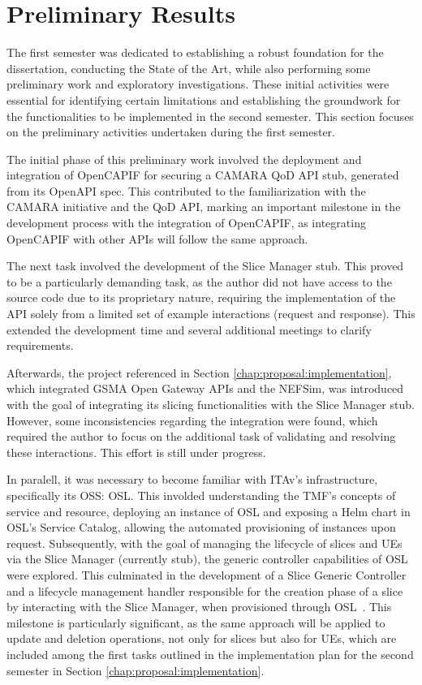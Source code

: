 \section{Preliminary Results}
\label{chap:proposal:preliminary}

The first semester was dedicated to establishing a robust foundation for the dissertation, conducting the State of the Art, while also performing some  preliminary work and exploratory investigations. These initial activities were essential for identifying certain limitations and establishing the groundwork for the functionalities to be implemented in the second semester. This section focuses on the preliminary activities undertaken during the first semester.

The initial phase of this preliminary work involved the deployment and integration of OpenCAPIF for securing a CAMARA \acs{QoD} \acs{API} stub, generated from its Open\acs{API} spec. This contributed to the familiarization with the CAMARA initiative and the \acs{QoD} \acs{API}, marking an important milestone in the development process with the integration of OpenCAPIF, as integrating OpenCAPIF with other \acsp{API} will follow the same approach.

The next task involved the development of the Slice Manager stub. This proved to be a particularly demanding task, as the author did not have access to the source code due to its proprietary nature, requiring the implementation of the \acs{API} solely from a limited set of example interactions (request and response). This extended the development time and  several additional meetings to clarify requirements.

Afterwards, the project referenced in Section \ref{chap:proposal:implementation}, which integrated \acs{GSMA} Open Gateway \acsp{API} and the NEFSim, was introduced with the goal of integrating its slicing functionalities with the Slice Manager stub. However, some inconsistencies regarding the integration were found, which required the author to focus on the additional task of validating and resolving these interactions. This effort is still under progress.

In paralell, it was necessary to become familiar with \acs{ITAv}'s infrastructure, specifically its \acs{OSS}: \acl{OSL}. This involded understanding the \acs{TMF}'s concepts of service and resource, deploying an instance of \acs{OSL} and exposing a Helm chart in \acs{OSL}'s Service Catalog, allowing the automated provisioning of instances upon request. Subsequently, with the goal of managing the lifecycle of slices and \acsp{UE} via the Slice Manager (currently stub), the generic controller capabilities of \acs{OSL} were explored. This culminated in the development of a Slice Generic Controller and a lifecycle management handler responsible for the creation phase of a slice by interacting with the Slice Manager, when provisioned through \acs{OSL}~\cite{OSLSlicingGcontrollerGithub}. This milestone is particularly significant, as the same approach will be applied to update and deletion operations, not only for slices but also for \acsp{UE}, which are included among the first tasks outlined in the implementation plan for the second semester in Section \ref{chap:proposal:implementation}.
